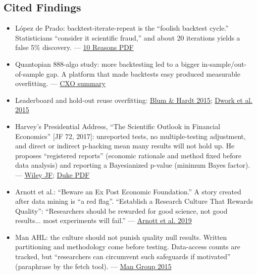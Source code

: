\documentclass{article}
\begin{document}
\subsection{Cited Findings}

\begin{itemize}

\item López de Prado: backtest-iterate-repeat is the ``foolish backtest cycle.'' Statisticians ``consider it scientific fraud,'' and about 20 iterations yields a false 5\% discovery. --- \href{https://www.smallake.kr/wp-content/uploads/2018/07/SSRN-id3104816.pdf}{10 Reasons PDF}

\item Quantopian 888-algo study: more backtesting led to a bigger in-sample/\allowbreak{}out-of-sample gap. A platform that made backtests easy produced measurable overfitting. --- \href{https://www.cxoadvisory.com/big-ideas/in-sample-vs-out-of-sample-performance-of-888-trading-strategies/}{CXO summary}

\item Leaderboard and hold-out reuse overfitting: \href{https://arxiv.org/pdf/1502.04585}{Blum \& Hardt 2015}; \href{https://www.science.org/doi/10.1126/science.aaa9375}{Dwork et al. 2015}

\item Harvey's Presidential Address, ``The Scientific Outlook in Financial Economics'' [JF 72, 2017]: unreported tests, no multiple-testing adjustment, and direct or indirect p-hacking mean many results will not hold up. He proposes ``registered reports'' (economic rationale and method fixed before data analysis) and reporting a Bayesianized p-value (minimum Bayes factor). --- \href{https://onlinelibrary.wiley.com/doi/abs/10.1111/jofi.12530}{Wiley JF}; \href{https://people.duke.edu/~charvey/Research/Published_Papers/P131_The_scientific_outlook.pdf}{Duke PDF}

\item Arnott et al.: ``Beware an Ex Post Economic Foundation.'' A story created after data mining is ``a red flag''. ``Establish a Research Culture That Rewards Quality'': ``Researchers should be rewarded for good science, not good results... most experiments will fail.'' --- \href{https://people.duke.edu/~charvey/Research/Published_Papers/P138_A_backtesting_protocol.pdf}{Arnott et al. 2019}

\item Man AHL: the culture should not punish quality null results. Written partitioning and methodology come before testing. Data-access counts are tracked, but ``researchers can circumvent such safeguards if motivated'' (paraphrase by the fetch tool). --- \href{https://www.man.com/insights/overfitting-and-its-impact-on-the-investor}{Man Group 2015}


\end{itemize}
\end{document}

